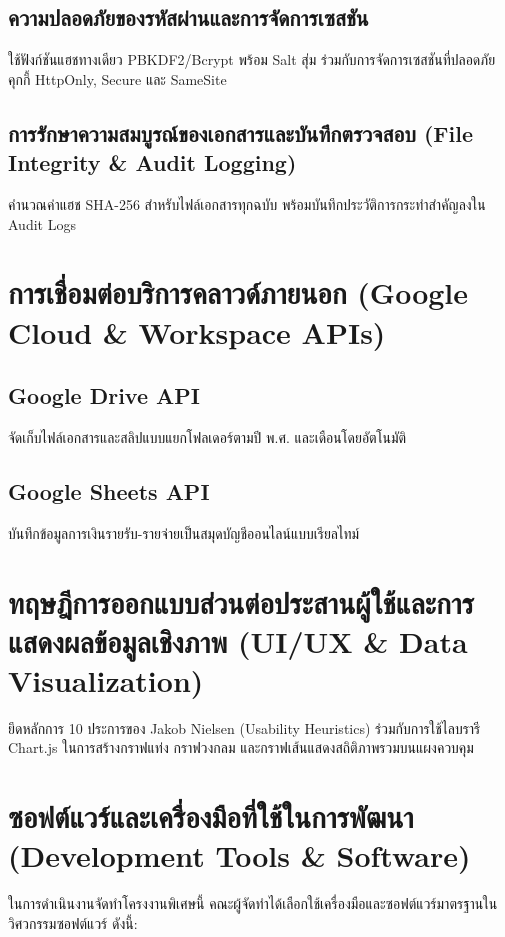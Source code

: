 \subsection{ความปลอดภัยของรหัสผ่านและการจัดการเซสชัน}
\hspace*{1.3em}
ใช้ฟังก์ชันแฮชทางเดียว PBKDF2/Bcrypt พร้อม Salt สุ่ม ร่วมกับการจัดการเซสชันที่ปลอดภัย คุกกี้ HttpOnly, Secure และ SameSite

\subsection{การรักษาความสมบูรณ์ของเอกสารและบันทึกตรวจสอบ (File Integrity \& Audit Logging)}
\hspace*{1.3em}
คำนวณค่าแฮช SHA-256 สำหรับไฟล์เอกสารทุกฉบับ พร้อมบันทึกประวัติการกระทำสำคัญลงใน Audit Logs

\section{การเชื่อมต่อบริการคลาวด์ภายนอก (Google Cloud \& Workspace APIs)}

\subsection{Google Drive API}
\hspace*{1.3em}
จัดเก็บไฟล์เอกสารและสลิปแบบแยกโฟลเดอร์ตามปี พ.ศ. และเดือนโดยอัตโนมัติ

\subsection{Google Sheets API}
\hspace*{1.3em}
บันทึกข้อมูลการเงินรายรับ-รายจ่ายเป็นสมุดบัญชีออนไลน์แบบเรียลไทม์

\section{ทฤษฎีการออกแบบส่วนต่อประสานผู้ใช้และการแสดงผลข้อมูลเชิงภาพ (UI/UX \& Data Visualization)}
\hspace*{1.3em}
ยึดหลักการ 10 ประการของ Jakob Nielsen (Usability Heuristics) ร่วมกับการใช้ไลบรารี Chart.js ในการสร้างกราฟแท่ง กราฟวงกลม และกราฟเส้นแสดงสถิติภาพรวมบนแผงควบคุม

\section{ซอฟต์แวร์และเครื่องมือที่ใช้ในการพัฒนา (Development Tools \& Software)}
\hspace*{1.3em}
ในการดำเนินงานจัดทำโครงงานพิเศษนี้ คณะผู้จัดทำได้เลือกใช้เครื่องมือและซอฟต์แวร์มาตรฐานในวิศวกรรมซอฟต์แวร์ ดังนี้:

